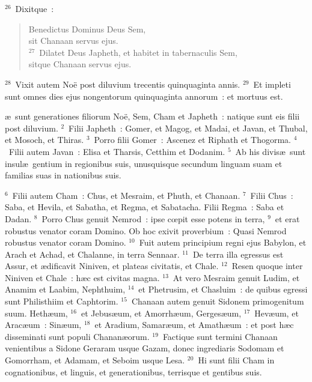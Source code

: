${}^{26}$~Dixitque~: \begin{flushleft}\begin{verse}Benedictus Dominus Deus Sem,\\ sit Chanaan servus ejus.\\
${}^{27}$~Dilatet Deus Japheth, et habitet in tabernaculis Sem,\\ sitque Chanaan servus ejus.\end{verse}\end{flushleft}


${}^{28}$~Vixit autem No\"e post diluvium trecentis quinquaginta annis.
${}^{29}$~Et impleti sunt omnes dies ejus nongentorum quinquaginta annorum~: et mortuus est.

\bchapter
{}\ae\ sunt generationes filiorum No\"e, Sem, Cham et Japheth~: natique sunt eis filii post diluvium.
${}^{2}$~Filii Japheth~: Gomer, et Magog, et Madai, et Javan, et Thubal, et Mosoch, et Thiras.
${}^{3}$~Porro filii Gomer~: Ascenez et Riphath et Thogorma.
${}^{4}$~Filii autem Javan~: Elisa et Tharsis, Cetthim et Dodanim.
${}^{5}$~Ab his divis\ae\ sunt insul\ae\ gentium in regionibus suis, unusquisque secundum linguam suam et familias suas in nationibus suis.


${}^{6}$~Filii autem Cham~: Chus, et Mesraim, et Phuth, et Chanaan.
${}^{7}$~Filii Chus~: Saba, et Hevila, et Sabatha, et Regma, et Sabatacha. Filii Regma~: Saba et Dadan.
${}^{8}$~Porro Chus genuit Nemrod~: ipse cœpit esse potens in terra,
${}^{9}$~et erat robustus venator coram Domino. Ob hoc exivit proverbium~: Quasi Nemrod robustus venator coram Domino.
${}^{10}$~Fuit autem principium regni ejus Babylon, et Arach et Achad, et Chalanne, in terra Sennaar.
${}^{11}$~De terra illa egressus est Assur, et \ae dificavit Niniven, et plateas civitatis, et Chale.
${}^{12}$~Resen quoque inter Niniven et Chale~: h\ae c est civitas magna.
${}^{13}$~At vero Mesraim genuit Ludim, et Anamim et Laabim, Nephthuim,
${}^{14}$~et Phetrusim, et Chasluim~: de quibus egressi sunt Philisthiim et Caphtorim.
${}^{15}$~Chanaan autem genuit Sidonem primogenitum suum. Heth\ae um,
${}^{16}$~et Jebus\ae um, et Amorrh\ae um, Gerges\ae um,
${}^{17}$~Hev\ae um, et Arac\ae um~: Sin\ae um,
${}^{18}$~et Aradium, Samar\ae um, et Amath\ae um~: et post h\ae c disseminati sunt populi Chanan\ae orum.
${}^{19}$~Factique sunt termini Chanaan venientibus a Sidone Geraram usque Gazam, donec ingrediaris Sodomam et Gomorrham, et Adamam, et Seboim usque Lesa.
${}^{20}$~Hi sunt filii Cham in cognationibus, et linguis, et generationibus, terrisque et gentibus suis.


